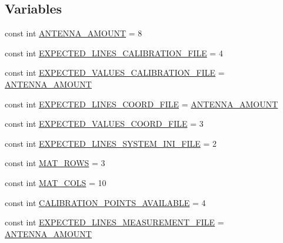 \subsection*{\-Variables}
\begin{DoxyCompactItemize}
\item 
const int \hyperlink{namespace_p_r_p_s_evolution_ae8fd15954b83f65c6dfa876814a1923d}{\-A\-N\-T\-E\-N\-N\-A\-\_\-\-A\-M\-O\-U\-N\-T} = 8
\item 
const int \hyperlink{namespace_p_r_p_s_evolution_ab66b487333f4f165dd621808ddc9ced1}{\-E\-X\-P\-E\-C\-T\-E\-D\-\_\-\-L\-I\-N\-E\-S\-\_\-\-C\-A\-L\-I\-B\-R\-A\-T\-I\-O\-N\-\_\-\-F\-I\-L\-E} = 4
\item 
const int \hyperlink{namespace_p_r_p_s_evolution_a184ab9c885da3e6b6ceb92842a67cd9d}{\-E\-X\-P\-E\-C\-T\-E\-D\-\_\-\-V\-A\-L\-U\-E\-S\-\_\-\-C\-A\-L\-I\-B\-R\-A\-T\-I\-O\-N\-\_\-\-F\-I\-L\-E} = \hyperlink{namespace_p_r_p_s_evolution_ae8fd15954b83f65c6dfa876814a1923d}{\-A\-N\-T\-E\-N\-N\-A\-\_\-\-A\-M\-O\-U\-N\-T}
\item 
const int \hyperlink{namespace_p_r_p_s_evolution_a33b7e7ecb530354564d1d2a2b9030c05}{\-E\-X\-P\-E\-C\-T\-E\-D\-\_\-\-L\-I\-N\-E\-S\-\_\-\-C\-O\-O\-R\-D\-\_\-\-F\-I\-L\-E} = \hyperlink{namespace_p_r_p_s_evolution_ae8fd15954b83f65c6dfa876814a1923d}{\-A\-N\-T\-E\-N\-N\-A\-\_\-\-A\-M\-O\-U\-N\-T}
\item 
const int \hyperlink{namespace_p_r_p_s_evolution_a8ee3546294cfed4378ee79b70061a50e}{\-E\-X\-P\-E\-C\-T\-E\-D\-\_\-\-V\-A\-L\-U\-E\-S\-\_\-\-C\-O\-O\-R\-D\-\_\-\-F\-I\-L\-E} = 3
\item 
const int \hyperlink{namespace_p_r_p_s_evolution_a67748544fc929f79123675ac334b9e77}{\-E\-X\-P\-E\-C\-T\-E\-D\-\_\-\-L\-I\-N\-E\-S\-\_\-\-S\-Y\-S\-T\-E\-M\-\_\-\-I\-N\-I\-\_\-\-F\-I\-L\-E} = 2
\item 
const int \hyperlink{namespace_p_r_p_s_evolution_aa19e4c2b7b2ab582072a916b8f68fce6}{\-M\-A\-T\-\_\-\-R\-O\-W\-S} = 3
\item 
const int \hyperlink{namespace_p_r_p_s_evolution_a1aa466bc495517d4f6a304abbd69f726}{\-M\-A\-T\-\_\-\-C\-O\-L\-S} = 10
\item 
const int \hyperlink{namespace_p_r_p_s_evolution_a7458d510a1d4ecbc3f5755158925c481}{\-C\-A\-L\-I\-B\-R\-A\-T\-I\-O\-N\-\_\-\-P\-O\-I\-N\-T\-S\-\_\-\-A\-V\-A\-I\-L\-A\-B\-L\-E} = 4
\item 
const int \hyperlink{namespace_p_r_p_s_evolution_a779c5864ab571a7d298fd91ade6054a6}{\-E\-X\-P\-E\-C\-T\-E\-D\-\_\-\-L\-I\-N\-E\-S\-\_\-\-M\-E\-A\-S\-U\-R\-E\-M\-E\-N\-T\-\_\-\-F\-I\-L\-E} = \hyperlink{namespace_p_r_p_s_evolution_ae8fd15954b83f65c6dfa876814a1923d}{\-A\-N\-T\-E\-N\-N\-A\-\_\-\-A\-M\-O\-U\-N\-T}

\end{DoxyCompactItemize}
